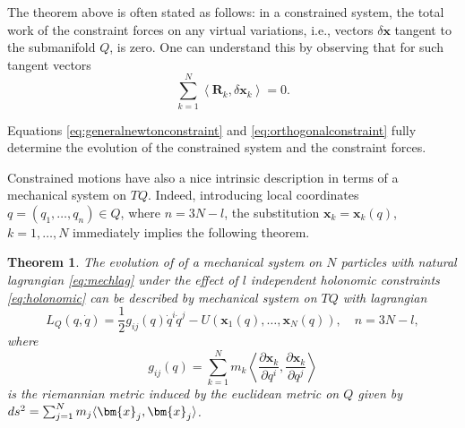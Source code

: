 \documentclass[english,fontsize=11pt,paper=a5,oneside]{scrbook}
\newcommand{\bx}{\bm{x}}
\newcommand{\lag}{\langle}
\newcommand{\rag}{\rangle}
\let\d\relax
\newcommand{\d}{\mathrm{d}}
\newtheorem{theorem}{Theorem}[chapter]
\theoremstyle{definition}
\newenvironment{remark}
  {\pushQED{\qed}\renewcommand{\qedsymbol}{$\lozenge$}\remarkx}
  {\popQED\endremarkx}
\begin{document}
\begin{remark}
  The theorem above is often stated as follows: in a constrained system, the total work of the constraint forces on any virtual variations, i.e., vectors $\delta\bx$ tangent to the submanifold $Q$, is zero.
  One can understand this by observing that for such tangent vectors
  \begin{equation}\label{eq:orthogonalconstraint}
    \sum_{k=1}^N \left\lag\bm{R}_k, \delta\bx_k\right\rag = 0.
  \end{equation}
\end{remark}

Equations \eqref{eq:generalnewtonconstraint} and \eqref{eq:orthogonalconstraint} fully determine the evolution of the constrained system and the constraint forces.

Constrained motions have also a nice intrinsic description in terms of a mechanical system on $TQ$. Indeed, introducing local coordinates $q= (q_1, \ldots, q_n)\in Q$, where $n = 3N-l$, the substitution $\bx_k = \bx_k(q)$, $k=1,\ldots,N$ immediately implies the following theorem.

\begin{theorem}
  The evolution of of a mechanical system on $N$ particles with natural lagrangian \eqref{eq:mechlag} under the effect of $l$ independent holonomic constraints \eqref{eq:holonomic} can be described by mechanical system on $TQ$ with lagrangian
  \begin{equation}
    L_Q(q,\dot q) = \frac12 g_{ij}(q)\dot q^i \dot q^j - U(\bx_1(q),\ldots,\bx_N(q)), \quad n = 3N-l,
  \end{equation}
  where
  \begin{equation}
    g_{ij}(q) = \sum_{k=1}^N m_k\left\lag\frac{\partial \bx_k}{\partial q^i},\frac{\partial \bx_k}{\partial q^j}\right\rag
  \end{equation}
  is the riemannian metric induced by the euclidean metric on $Q$ given by
  $ds^2 = \sum_{j=1}^N m_j\lag\d \bx_j, \d\bx_j\rag$.
\end{theorem}
\end{document}
